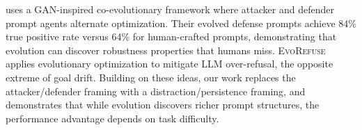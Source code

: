 \aegis \citep{aegis2025} uses a GAN-inspired co-evolutionary framework where attacker and defender prompt agents alternate optimization.
Their evolved defense prompts achieve 84\% true positive rate versus 64\% for human-crafted prompts, demonstrating that evolution can discover robustness properties that humans miss.
\textsc{EvoRefuse} \citep{evorefuse2025} applies evolutionary optimization to mitigate LLM over-refusal, the opposite extreme of goal drift.
Building on these ideas, our work replaces the attacker/defender framing with a distraction/persistence framing, and demonstrates that while evolution discovers richer prompt structures, the performance advantage depends on task difficulty.
